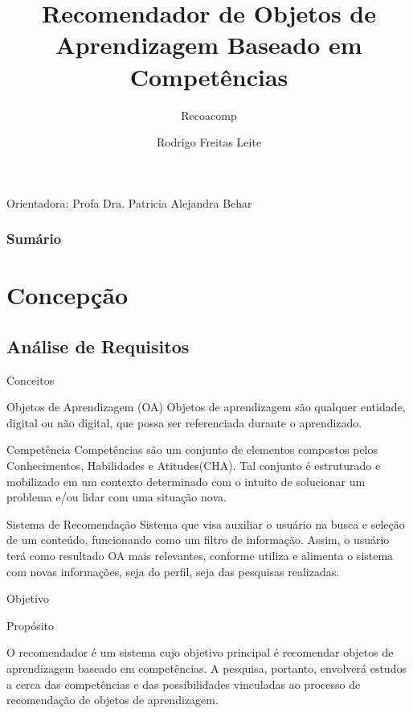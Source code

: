 \documentclass[xcolor=dvipsnames]{beamer}
\title{Recomendador de Objetos de Aprendizagem  Baseado em Competências}
\subtitle{Recoacomp}
\author{Rodrigo Freitas Leite}
\institute{UFRGS-NUTED}
\newcommand{\summario}
{
	\begin{frame}
		\frametitle{Sumário}
		\tableofcontents
	\end{frame}	
}
\begin{document}
\begin{frame}
	\titlepage
	\begin{center}
		Orientadora: Profa Dra. Patricia Alejandra Behar
	\end{center}
\end{frame}


\summario{}

\section{Concepção}
	\subsection{Análise de Requisitos}   
	  \begin{frame}{Conceitos}

	     \begin{block}{Objetos de Aprendizagem (OA)}
Objetos de aprendizagem são qualquer entidade, digital ou não digital, que possa ser referenciada durante o aprendizado.
	  	 \end{block}

 	     \begin{block}{Competência}
Competências são um conjunto de elementos compostos pelos Conhecimentos, Habilidades e Atitudes(CHA). Tal conjunto é estruturado e mobilizado em um contexto determinado com o intuito de solucionar um problema e/ou lidar com uma situação nova.
		 \end{block}

		 \begin{block}{Sistema de Recomendação}
Sistema que visa auxiliar o usuário na busca e seleção de um conteúdo, funcionando como um filtro de informação. Assim, o usuário terá como resultado OA mais relevantes, conforme utiliza e alimenta o sistema com novas informações, seja do perfil, seja das pesquisas realizadas.
		\end{block}	
	
	 \end{frame}

\begin{frame}{Objetivo}

	\begin{block}{Propósito}


O recomendador é um sistema cujo objetivo principal é recomendar objetos de aprendizagem baseado em competências.
A pesquisa, portanto, envolverá estudos a cerca das competências e das possibilidades vinculadas ao processo de recomendação de objetos de aprendizagem.
	\end{block}

\end{frame}
\end{document}
